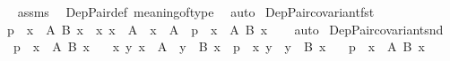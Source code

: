 \begin{isabellebody}
%
\isadelimproof
\ \ %
\endisadelimproof
%
\isatagproof
{}\isamarkupfalse%
\ assms\ \isamarkupfalse%
\ Dep{\isacharunderscore}{\kern0pt}Pair{\isacharunderscore}{\kern0pt}def\ meaning{\isacharunderscore}{\kern0pt}of{\isacharunderscore}{\kern0pt}type\ \isamarkupfalse%
\ auto%
\endisatagproof
{\isafoldproof}%
%
\isadelimproof
\isanewline
%
\endisadelimproof
\isanewline
{}\isamarkupfalse%
\ Dep{\isacharunderscore}{\kern0pt}Pair{\isacharunderscore}{\kern0pt}covariant{\isacharunderscore}{\kern0pt}fst{\isacharcolon}{\kern0pt}\isanewline
\ \ {\isachardoublequoteopen}p\ {\isacharcolon}{\kern0pt}\ {\isasymSum}x\ {\isacharcolon}{\kern0pt}\ A{\isachardot}{\kern0pt}\ {\isacharparenleft}{\kern0pt}B\ x{\isacharparenright}{\kern0pt}\ {\isasymLongrightarrow}\ {\isacharparenleft}{\kern0pt}{\isasymAnd}x{\isachardot}{\kern0pt}\ x\ {\isacharcolon}{\kern0pt}\ A\ {\isasymLongrightarrow}\ x\ {\isacharcolon}{\kern0pt}\ A{\isacharprime}{\kern0pt}{\isacharparenright}{\kern0pt}\ {\isasymLongrightarrow}\ p\ {\isacharcolon}{\kern0pt}\ {\isasymSum}x\ {\isacharcolon}{\kern0pt}\ A{\isacharprime}{\kern0pt}{\isachardot}{\kern0pt}\ {\isacharparenleft}{\kern0pt}B\ x{\isacharparenright}{\kern0pt}{\isachardoublequoteclose}\isanewline
%
\isadelimproof
\ \ %
\endisadelimproof
%
\isatagproof
{}\isamarkupfalse%
\ auto%
\endisatagproof
{\isafoldproof}%
%
\isadelimproof
\isanewline
%
\endisadelimproof
\isanewline
{}\isamarkupfalse%
\ Dep{\isacharunderscore}{\kern0pt}Pair{\isacharunderscore}{\kern0pt}covariant{\isacharunderscore}{\kern0pt}snd{\isacharcolon}{\kern0pt}\isanewline
\ \ \ {\isachardoublequoteopen}p\ {\isacharcolon}{\kern0pt}\ {\isasymSum}x\ {\isacharcolon}{\kern0pt}\ A{\isachardot}{\kern0pt}\ {\isacharparenleft}{\kern0pt}B\ x{\isacharparenright}{\kern0pt}{\isachardoublequoteclose}\isanewline
\ \ \ {\isachardoublequoteopen}{\isasymAnd}x\ y{\isachardot}{\kern0pt}\ x\ {\isacharcolon}{\kern0pt}\ A\ {\isasymLongrightarrow}\ y\ {\isacharcolon}{\kern0pt}\ B\ x\ {\isasymLongrightarrow}\ p\ {\isacharequal}{\kern0pt}\ {\isasymlangle}x{\isacharcomma}{\kern0pt}\ y{\isasymrangle}\ {\isasymLongrightarrow}\ y\ {\isacharcolon}{\kern0pt}\ B{\isacharprime}{\kern0pt}\ x{\isachardoublequoteclose}\isanewline
\ \ \ {\isachardoublequoteopen}p\ {\isacharcolon}{\kern0pt}\ {\isasymSum}x\ {\isacharcolon}{\kern0pt}\ A{\isachardot}{\kern0pt}\ {\isacharparenleft}{\kern0pt}B{\isacharprime}{\kern0pt}\ x{\isacharparenright}{\kern0pt}{\isachardoublequoteclose}\isanewline

\end{isabellebody}
